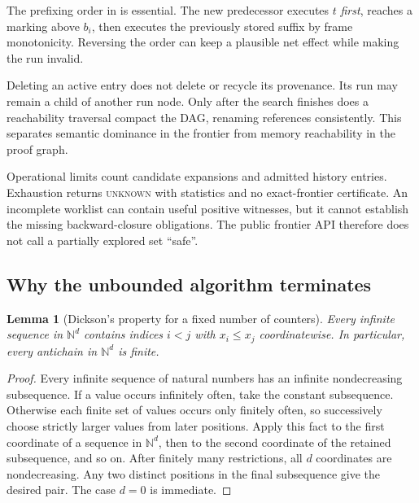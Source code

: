 \documentclass[11pt,a4paper]{article}
\newcommand{\N}{\mathbb N}
\newcommand{\code}[1]{\texttt{\detokenize{#1}}}
\newcommand{\unknown}{\textsc{unknown}}
\newtheorem{lemma}[theorem]{Lemma}
\theoremstyle{definition}
\theoremstyle{remark}
\begin{document}
The prefixing order in \code{seq(step(t), witness[i])} is essential. The new predecessor executes $t$ \emph{first}, reaches a marking above $b_i$, then executes the previously stored suffix by frame monotonicity. Reversing the order can keep a plausible net effect while making the run invalid.

Deleting an active entry does not delete or recycle its provenance. Its run may remain a child of another run node. Only after the search finishes does a reachability traversal compact the DAG, renaming references consistently. This separates semantic dominance in the frontier from memory reachability in the proof graph.

Operational limits count candidate expansions and admitted history entries. Exhaustion returns \unknown{} with statistics and no exact-frontier certificate. An incomplete worklist can contain useful positive witnesses, but it cannot establish the missing backward-closure obligations. The public frontier API therefore does not call a partially explored set ``safe''.

\subsection{Why the unbounded algorithm terminates}
\begin{lemma}[Dickson's property for a fixed number of counters]\label{lem:dickson}
Every infinite sequence in $\N^d$ contains indices $i<j$ with $x_i\le x_j$ coordinatewise. In particular, every antichain in $\N^d$ is finite.
\end{lemma}
\begin{proof}
Every infinite sequence of natural numbers has an infinite nondecreasing subsequence. If a value occurs infinitely often, take the constant subsequence. Otherwise each finite set of values occurs only finitely often, so successively choose strictly larger values from later positions. Apply this fact to the first coordinate of a sequence in $\N^d$, then to the second coordinate of the retained subsequence, and so on. After finitely many restrictions, all $d$ coordinates are nondecreasing. Any two distinct positions in the final subsequence give the desired pair. The case $d=0$ is immediate.
\end{proof}
\end{document}
